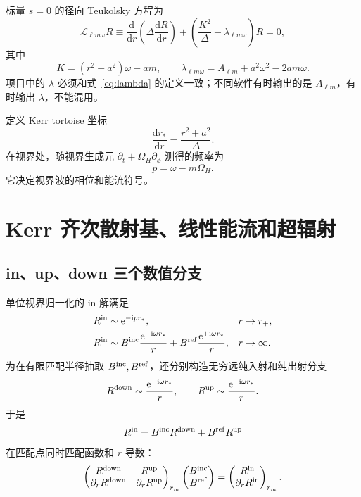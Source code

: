 \documentclass[UTF8,fontset=fandol,11pt,a4paper,oneside]{ctexart}
\numberwithin{equation}{section}
\newcommand{\dd}{\mathrm d}
\newcommand{\ii}{\mathrm i}
\newcommand{\ee}{\mathrm e}
\newcommand{\cL}{\mathcal L}
\newcommand{\Bin}{B^{\rm inc}}
\newcommand{\Bref}{B^{\rm ref}}
\newcommand{\Deltak}{\Delta}
\begin{document}
标量 $s=0$ 的径向 Teukolsky 方程为~\cite{Teukolsky1973}
\begin{equation}
\boxed{
\cL_{\ell m\omega}R\equiv
\frac{\dd}{\dd r}\left(\Deltak\frac{\dd R}{\dd r}\right)
+\left(\frac{K^2}{\Deltak}-\lambda_{\ell m\omega}\right)R=0,}
\label{eq:kerr-radial}
\end{equation}
其中
\begin{equation}
K=(r^2+a^2)\omega-am,
\qquad
\lambda_{\ell m\omega}=A_{\ell m}+a^2\omega^2-2am\omega.
\label{eq:lambda}
\end{equation}
项目中的 $\lambda$ 必须和式~\eqref{eq:lambda} 的定义一致；不同软件有时输出的是 $A_{\ell m}$，有时输出 $\lambda$，不能混用。

定义 Kerr tortoise 坐标
\begin{equation}
\frac{\dd r_*}{\dd r}=\frac{r^2+a^2}{\Deltak}.
\label{eq:kerr-tortoise}
\end{equation}
在视界处，随视界生成元 $\partial_t+\Omega_H\partial_\phi$ 测得的频率为
\begin{equation}
\boxed{p=\omega-m\Omega_H.}
\label{eq:p}
\end{equation}
它决定视界波的相位和能流符号。

\section{Kerr 齐次散射基、线性能流和超辐射}
\label{sec:kerr-linear}

\subsection{in、up、down 三个数值分支}

单位视界归一化的 in 解满足
\begin{align}
R^{\rm in}&\sim \ee^{-\ii p r_*},&&r\to r_+,\label{eq:kerr-in-h}\\
R^{\rm in}&\sim
\Bin\frac{\ee^{-\ii\omega r_*}}{r}
+\Bref\frac{\ee^{+\ii\omega r_*}}{r},&&r\to\infty.
\label{eq:kerr-in-inf}
\end{align}
为在有限匹配半径抽取 $\Bin,\allowbreak \Bref$，还分别构造无穷远纯入射和纯出射分支
\begin{equation}
R^{\rm down}\sim \frac{\ee^{-\ii\omega r_*}}{r},\qquad
R^{\rm up}\sim \frac{\ee^{+\ii\omega r_*}}{r}.
\end{equation}
于是
\begin{equation}
R^{\rm in}=\Bin R^{\rm down}+\Bref R^{\rm up}
\end{equation}
在匹配点同时匹配函数和 $r$ 导数：
\begin{equation}
\begin{pmatrix}
R^{\rm down}&R^{\rm up}\\
\partial_rR^{\rm down}&\partial_rR^{\rm up}
\end{pmatrix}_{r_m}
\begin{pmatrix}\Bin\\\Bref\end{pmatrix}
=
\begin{pmatrix}R^{\rm in}\\\partial_rR^{\rm in}\end{pmatrix}_{r_m}.
\label{eq:matching}
\end{equation}
\end{document}
